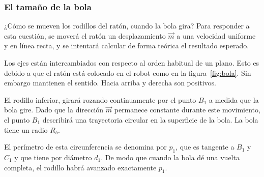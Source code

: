 \documentclass[10pt,a4paper,hidelinks,twocolumn]{article}
\begin{document}
\begin{center}
\end{center}
\subsubsection{El tamaño de la bola}

¿Cómo se mueven los rodillos del ratón, cuando la bola gira? Para responder a 
esta cuestión, se moverá el ratón un desplazamiento $\vec{m}$ a una velocidad 
uniforme y en línea recta, y se intentará calcular de forma teórica el resultado 
esperado.

Los ejes están intercambiados con respecto al orden habitual de un plano. Esto 
es debido a que el ratón está colocado en el robot como en la 
figura~\ref{fig:bola}. Sin embargo mantienen el sentido. Hacia arriba y derecha 
son positivos.

El rodillo inferior, girará rozando continuamente por el punto $B_1$ a medida 
que la bola gire. Dado que la dirección $\vec{m}$ permanece constante durante 
este movimiento, el punto $B_1$ describirá una trayectoria circular en la 
superficie de la bola. La bola tiene un radio $R_b$.

El perímetro de esta circunferencia se denomina por $p_1$, que es tangente a 
$B_1$ y $C_1$ y que tiene por diámetro $d_1$. De modo que cuando la bola dé una 
vuelta completa, el rodillo habrá avanzado exactamente $p_1$.
\end{document}
